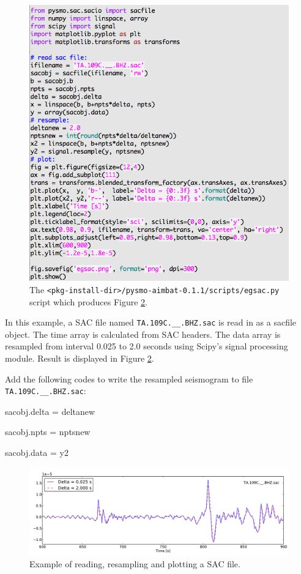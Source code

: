 \documentclass[12pt, titlepage]{article}
\newenvironment{lyxcode}
{\begin{list}{}{
\setlength{\rightmargin}{\leftmargin}
\setlength{\listparindent}{0pt}%
\raggedright
\setlength{\itemsep}{0pt}
\setlength{\parsep}{0pt}
\normalfont\ttfamily}%
 \item[]}
{\end{list}}
\begin{document}
\begin{figure}[!h]
    \centering
    \includegraphics[width = 0.9 \textwidth]{figs/prog-egsac.png}
    \caption{The \texttt{<pkg-install-dir>/pysmo-aimbat-0.1.1/scripts/egsac.py} script which produces Figure \ref{fig:egsac}. }
    \label{fig:prog-egsac}
\end{figure}


In this example, a SAC file named \texttt{TA.109C.\_\_.BHZ.sac} is read in as a sacfile object.
The time array is calculated from SAC headers. 
The data array is resampled from interval 0.025 to 2.0 seconds using Scipy's signal processing module.
Result is displayed in Figure \ref{fig:egsac}.

Add the following codes to write the resampled seismogram to file \texttt{TA.109C.\_\_.BHZ.sac}:

\begin{lyxcode}
sacobj.delta = deltanew

sacobj.npts = nptsnew

sacobj.data = y2
\end{lyxcode}



\begin{figure}[!h]
    \centering
    \includegraphics[width = 0.99 \textwidth]{figs/egsac-109c.pdf}
    \caption{Example of reading, resampling and plotting a SAC file. }
    \label{fig:egsac}
\end{figure}
\end{document}
